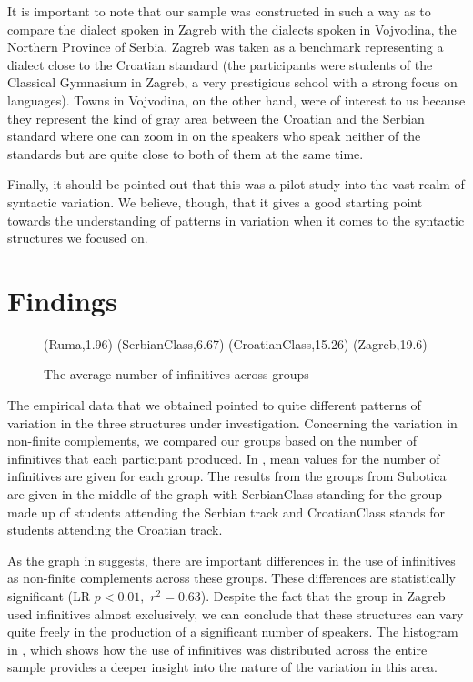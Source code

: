 \documentclass[output=paper,modfonts,newtxmath,hidelinks,]{langscibook}
\begin{document}
It is important to note that our sample was constructed in such a way as to compare the dialect spoken in Zagreb with the dialects spoken in Vojvodina, the Northern Province of Serbia. Zagreb was taken as a benchmark representing a dialect close to the Croatian standard (the participants were students of the Classical Gymnasium in Zagreb, a very prestigious school with a strong focus on languages). Towns in Vojvodina, on the other hand, were of interest to us because they represent the kind of gray area between the Croatian and the Serbian standard where one can zoom in on the speakers who speak neither of the standards but are quite close to both of them at the same time.

Finally, it should be pointed out that this was a pilot study into the vast realm of syntactic variation. We believe, though, that it gives a good starting point towards the understanding of patterns in variation when it comes to the syntactic structures we focused on.\largerpage

\section{Findings}\label{7:s3}

\begin{figure}[b]
\footnotesize
\textsf{ 
%
{
(Ruma,1.96)
(SerbianClass,6.67)
(CroatianClass,15.26)
(Zagreb,19.6)
}}
\caption{The average number of infinitives across groups}\label{7:fig:key:1}
\end{figure}


The empirical data that we obtained pointed to quite different patterns of variation in the three structures under investigation. Concerning the variation in non-finite complements, we compared our groups based on the number of infinitives that each participant produced. In , mean values for the number of infinitives are given for each group. The results from the groups from Subotica are given in the middle of the graph with \textsf{SerbianClass} standing for the group made up of students attending the Serbian track and 
\textsf{CroatianClass} stands for students attending the Croatian track.

\newpage 
As the graph in  suggests, there are important differences in the use of infinitives as non-finite complements across these groups. These differences are statistically significant (LR $p<0.01,$ $r^2 = 0.63$). Despite the fact that the group in Zagreb used infinitives almost exclusively, we can conclude that these structures can vary quite freely in the production of a significant number of speakers. The histogram in , which shows how the use of infinitives was distributed across the entire sample provides a deeper insight into the nature of the variation in this area.
\end{document}
